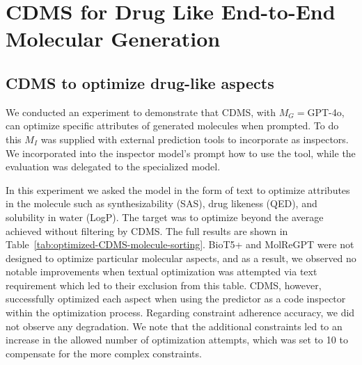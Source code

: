 \documentclass[10pt]{article} %
\begin{document}
    \section{CDMS for Drug Like End-to-End Molecular Generation}
    \label{app:cdms_opt}

    \subsection{CDMS to optimize drug-like aspects}
    
    We conducted an experiment to demonstrate that CDMS, with $M_G = $GPT-4o, can optimize specific attributes of generated molecules when prompted. To do this $M_I$ was supplied with external prediction tools to incorporate as inspectors. We incorporated into the inspector model’s prompt how to use the tool, while the evaluation was delegated to the specialized model.
    
    In this experiment we asked the model in the form of text to optimize attributes in the molecule such as synthesizability (SAS), drug likeness (QED), and solubility in water (LogP). The target was to optimize beyond the average achieved without filtering by CDMS. The full results are shown in Table~\ref{tab:optimized-CDMS-molecule-sorting}. BioT5+ and MolReGPT were not designed to optimize particular molecular aspects, and as a result, we observed no notable improvements when textual optimization was attempted via text requirement which led to their exclusion from this table. CDMS, however, successfully optimized each aspect when using the predictor as a code inspector within the optimization process. Regarding constraint adherence accuracy, we did not observe any degradation. We note that the additional constraints led to an increase in the allowed number of optimization attempts, which was set to 10 to compensate for the more complex constraints.
    
\end{document}
